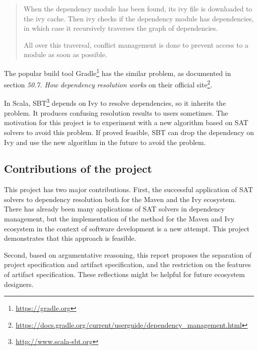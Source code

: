 \begin{quote}
  When the dependency module has been found, its ivy file is downloaded to the ivy cache. Then ivy checks if the dependency module has dependencies, in which case it recursively traverses the graph of dependencies.

  All over this traversal, conflict management is done to prevent access to a module as soon as possible.
\end{quote}

The popular build tool Gradle\footnote{\url{https://gradle.org}} has the similar problem, as documented in section \emph{50.7. How dependency resolution works} on their official site\footnote{\url{https://docs.gradle.org/current/userguide/dependency_management.html}}.

In Scala, SBT\footnote{\url{http://www.scala-sbt.org}} depends on Ivy to resolve dependencies, so it inherits the problem. It produces confusing resolution results to users sometimes. The motivation for this project is to experiment with a new algorithm based on SAT solvers to avoid this problem. If proved feasible, SBT can drop the dependency on Ivy and use the new algorithm in the future to avoid the problem.

\subsection{Contributions of the project}

This project has two major contributions. First, the successful application of SAT solvers to dependency resolution both for the Maven and the Ivy ecosystem. There has already been many applications of SAT solvers in dependency management\cite{mancinelli2006managing, berre2009dependency, vouillon2013software}, but the implementation of the method for the Maven and Ivy ecosystem in the context of software development is a new attempt. This project demonstrates that this approach is feasible.

Second, based on argumentative reasoning, this report proposes the separation of project specification and artifact specification, and the restriction on the features of artifact specification. These reflections might be helpful for future ecosystem designers.
